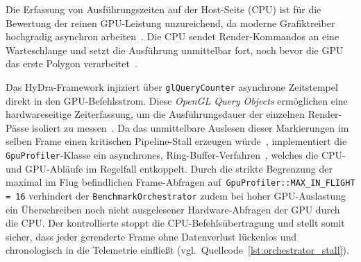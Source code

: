 Die Erfassung von Ausführungszeiten auf der Host-Seite (\ac{CPU}) ist für die Bewertung der reinen
\ac{GPU}-Leistung unzureichend, da moderne Grafiktreiber hochgradig asynchron
arbeiten~\parencite[vgl.][S.~1005]{akenine-mollerRealtimeRendering2019}.
Die \ac{CPU} sendet Render-Kommandos an eine Warteschlange und setzt die Ausführung unmittelbar fort, noch bevor die
\ac{GPU} das erste Polygon
verarbeitet~\parencite[vgl.][Abschn.~\textit{The logical pipeline} 1--2]{pixeljetstreamPixelJetStream2015}.

Das \ac{HyDra}-Framework injiziert über \texttt{glQueryCounter} asynchrone Zeitstempel direkt in den
\ac{GPU}-Befehlsstrom.
Diese \textit{OpenGL Query Objects} ermöglichen eine hardwareseitige Zeiterfassung, um die Ausführungsdauer der
einzelnen Render-Pässe isoliert zu messen~\parencite[vgl.][Kap.~2.14]{OpenGL33Core2010}.
Da das unmittelbare Auslesen dieser Markierungen im selben Frame einen kritischen Pipeline-Stall erzeugen
würde~\parencite[vgl.][S.~794]{akenine-mollerRealtimeRendering2019},
implementiert die \texttt{GpuProfiler}-Klasse ein asynchrones, 
Ring-Buffer-Verfahren~\parencite[vgl.][Kap.~34.2.5]{OpenGLInsights}, welches die \ac{CPU}- und \ac{GPU}-Abläufe im Regelfall
entkoppelt.
Durch die strikte Begrenzung der maximal im Flug befindlichen Frame-Abfragen
auf~\texttt{GpuProfiler::MAX\_IN\_FLIGHT = 16} verhindert der \texttt{BenchmarkOrchestrator} zudem bei hoher
\ac{GPU}-Auslastung ein Überschreiben noch nicht ausgelesener Hardware-Abfragen der \ac{GPU} durch die \ac{CPU}.
Der kontrollierte  stoppt die \ac{CPU}-Be\-fehls\-über\-tra\-gung und stellt somit sicher, dass jeder
gerenderte Frame ohne Datenverlust lückenlos und chronologisch in die Telemetrie einfließt
(vgl.\ Quellcode~\ref{lst:orchestrator_stall}).


